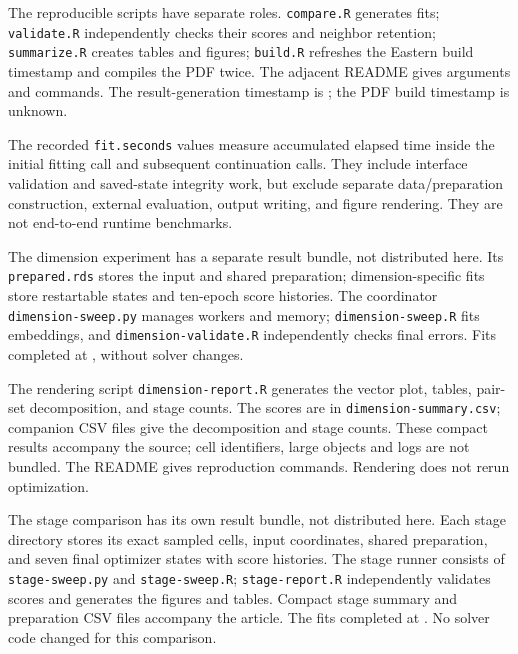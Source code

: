 \documentclass[11pt]{article}
\providecommand{\reportbuilddatetime}{unknown}
\begin{document}
The reproducible scripts have separate roles.
\texttt{compare.R} generates fits; \texttt{validate.R} independently checks
their scores and neighbor retention; \texttt{summarize.R} creates tables and
figures; \texttt{build.R} refreshes the Eastern build timestamp and compiles
the PDF twice. The adjacent README gives arguments and commands.
The result-generation timestamp is \resultgenerated; the PDF build timestamp
is \reportbuilddatetime.

The recorded \texttt{fit.seconds} values measure accumulated elapsed time
inside the initial fitting call and subsequent continuation calls. They
include interface validation and saved-state integrity work, but exclude
separate data/preparation construction, external evaluation, output writing,
and figure rendering. They are not end-to-end runtime benchmarks.

The dimension experiment has a separate result bundle, not distributed here.
Its \texttt{prepared.rds} stores the input and shared preparation;
dimension-specific fits store restartable states and ten-epoch score histories.
The coordinator \texttt{dimension-sweep.py} manages workers and memory;
\texttt{dimension-sweep.R} fits embeddings, and
\texttt{dimension-validate.R} independently checks final errors.
Fits completed at \dimensiongenerated, without solver changes.

The rendering script \texttt{dimension-report.R} generates the vector plot,
tables, pair-set decomposition, and stage counts. The scores are in
\texttt{dimension-summary.csv}; companion CSV files give the decomposition
and stage counts. These compact results accompany the source; cell identifiers,
large objects and logs are not bundled. The README gives reproduction commands.
Rendering does not rerun optimization.

The stage comparison has its own result bundle, not distributed here.
Each stage directory stores its exact sampled cells, input coordinates,
shared preparation, and seven final optimizer states with score histories.
The stage runner consists of \texttt{stage-sweep.py} and
\texttt{stage-sweep.R}; \texttt{stage-report.R} independently validates
scores and generates the figures and tables. Compact stage summary and
preparation CSV files accompany the article. The fits completed at
\stagegenerated. No solver code changed for this comparison.
\end{document}
